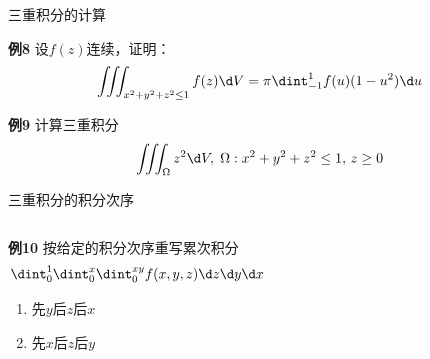 \begin{frame}{三重积分的计算}
	\linespread{1.2} 
	\begin{exampleblock}{{\bf 例8}\hfill}
		设$f(z)$连续，证明：
		$$\iiint_{x^2+y^2+z^2\leq 1}f(z)\d V=\pi\dint_{-1}^1f(u)(1-u^2)\d u$$
	\end{exampleblock}
	\bigskip\pause
	\begin{exampleblock}{{\bf 例9}\hfill}
		计算三重积分
		$$\iiint_{\Omega}z^2\d V,\;\Omega:x^2+y^2+z^2\leq 1,\,z\geq 0$$
	\end{exampleblock}	
\end{frame}

\begin{frame}{三重积分的积分次序}
	\linespread{1.2}
	\begin{columns}
			\begin{exampleblock}{{\bf 例10}\hfill}
				按给定的积分次序重写累次积分
				$$\dint_0^1\dint_0^x\dint_0^{xy}f(x,y,z)\d z\d y\d x$$
				\begin{enumerate}
				  \item 先$y$后$z$后$x$
				  \item 先$x$后$z$后$y$
				\end{enumerate}
			\end{exampleblock}
			\begin{center}
				\pause {}
			\end{center}
	\end{columns}
\end{frame}

